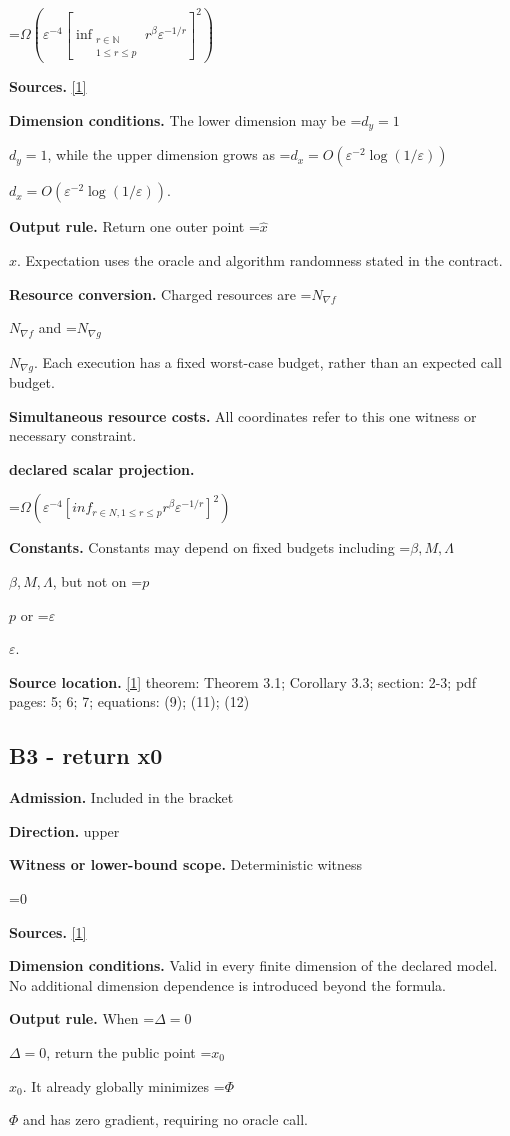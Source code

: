 \documentclass[10pt,a4paper]{article}
\newcommand{\AtlasMath}[1]{\par\begingroup\centering\setbox0=\hbox{$\displaystyle #1$}\ifdim\wd0>1.4\linewidth\typeout{ATLAS WIDE FORMULA: \the\wd0}\fi\ifdim\wd0>\linewidth\resizebox{\linewidth}{!}{\box0}\else\box0\fi\par\endgroup}
\newcommand{\AtlasInlineMath}[1]{\begingroup\setbox0=\hbox{$#1$}\ifdim\wd0>.4\linewidth\endgroup\AtlasMath{#1}\else\endgroup$#1$\fi}
\begin{document}
\AtlasMath{\Omega\!\left(\varepsilon^{-4}\left[\inf_{\substack{r\in\mathbb{N}\\1\le r\le p}}r^\beta\varepsilon^{-1/r}\right]^2\right)}
\textbf{Sources.} \href{https://arxiv.org/pdf/2610.03638v2}{[1]}

\textbf{Dimension conditions.} The lower dimension may be \AtlasInlineMath{d_y=1}, while the upper dimension grows as \AtlasInlineMath{d_x=O(\varepsilon^{-2}\log(1/\varepsilon))}.

\textbf{Output rule.} Return one outer point \AtlasInlineMath{\widehat x}. Expectation uses the oracle and algorithm randomness stated in the contract.

\textbf{Resource conversion.} Charged resources are \AtlasInlineMath{N_{\nabla f}} and \AtlasInlineMath{N_{\nabla g}}. Each execution has a fixed worst-case budget, rather than an expected call budget.

\textbf{Simultaneous resource costs.} All coordinates refer to this one witness or necessary constraint.

\textbf{declared scalar projection.}

\AtlasMath{\Omega (\varepsilon ^{-4} [inf_{r\in N,1\le r\le p} r^\beta  \varepsilon ^{-1/r}]^2)}
\textbf{Constants.} Constants may depend on fixed budgets including \AtlasInlineMath{\beta,M,\Lambda}, but not on \AtlasInlineMath{p} or \AtlasInlineMath{\varepsilon}.

\textbf{Source location.} \href{https://arxiv.org/pdf/2610.03638v2}{[1]} theorem: Theorem 3.1; Corollary 3.3; section: 2-3; pdf pages: 5; 6; 7; equations: (9); (11); (12)

\subsection{B3 - return x0}
\textbf{Admission.} Included in the bracket

\textbf{Direction.} upper

\textbf{Witness or lower-bound scope.} Deterministic witness

\AtlasMath{0}
\textbf{Sources.} \href{https://arxiv.org/pdf/2610.03638v2}{[1]}

\textbf{Dimension conditions.} Valid in every finite dimension of the declared model. No additional dimension dependence is introduced beyond the formula.

\textbf{Output rule.} When \AtlasInlineMath{\Delta=0}, return the public point \AtlasInlineMath{x_0}. It already globally minimizes \AtlasInlineMath{\Phi} and has zero gradient, requiring no oracle call.
\end{document}
